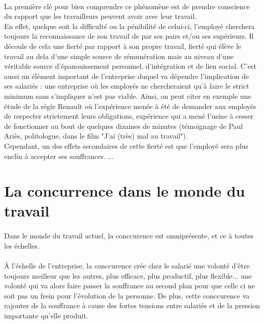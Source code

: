 \documentclass{report}
\begin{document}
		\paragraph{}
			La première clé pour bien comprendre ce phénomène est de prendre conscience du rapport que les travailleurs peuvent avoir avec leur travail.\\
			En effet, quelque soit la difficulté ou la pénibilité de celui-ci, l'employé cherchera toujours la reconnaissance de son travail de par ses pairs et/ou ses supérieurs. Il découle de cela une fierté par rapport à son propre travail, fierté qui élève le travail au dela d'une simple source de rémunération mais au niveau d'une véritable source d'épanouissement personnel, d'intégration et de lien social. C'est aussi un élèment important de l'entreprise duquel va dépendre l'implication de ses salariés : une entreprise où les employés ne chercheraient qu'à faire le strict minimum sans s'impliquer n'est pas viable. Ainsi, on peut citer en exemple une étude de la régie Renault où l'expérience menée à été de demander aux employés de respecter strictement leurs obligations, expérience qui a mené l'usine à cesser de fonctionner au bout de quelques dizaines de minutes (témoignage de Paul Ariès, politologue, dans le film "J'ai (très) mal au travail").\\
			Cependant, un des effets secondaires de cette fierté est que l'employé sera plus enclin à accepter ses souffrances. ...
	\section{La concurrence dans le monde du travail}
		\paragraph{}
			Dans le monde du travail actuel, la conccurence est omniprésente, et ce à toutes les échelles.
		\paragraph{}
			À l'échelle de l'entreprise, la conccurence crée chez le salarié une volonté d'être toujours meilleur que les autres, plus efficace, plus productif, plus flexible... une volonté qui va alors faire passer la souffrance au second plan pour que celle ci ne soit pas un frein pour l'évolution de la personne. De plus, cette conccurence va rajouter de la souffrance à cause des fortes tensions entre salariés et de la pression importante qu'elle produit.
\end{document}
